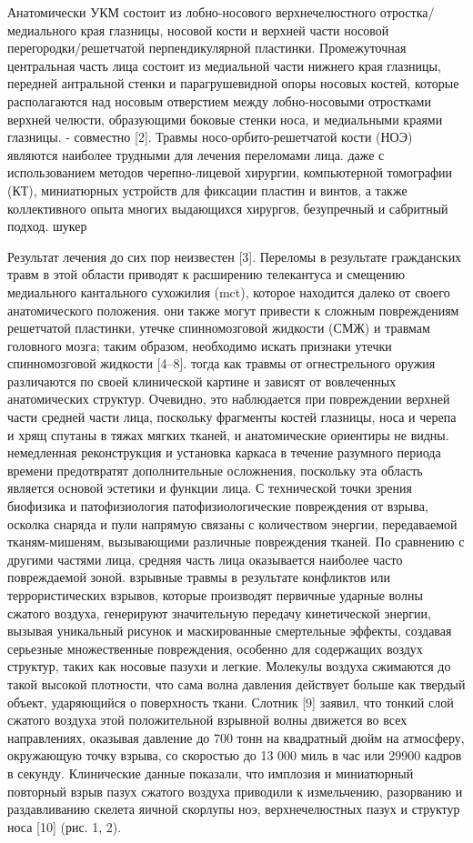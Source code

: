 Анатомически УКМ состоит из лобно-носового верхнечелюстного отростка/медиального
края глазницы, носовой кости и верхней части носовой перегородки/решетчатой
перпендикулярной пластинки. Промежуточная центральная часть лица
состоит из медиальной части нижнего края глазницы, передней антральной стенки и
парагрушевидной опоры носовых костей, которые располагаются над носовым
отверстием между лобно-носовыми отростками верхней челюсти, образующими боковые
стенки носа, и медиальными краями глазницы. - совместно [2]. Травмы
носо-орбито-решетчатой кости (НОЭ) являются наиболее трудными для
лечения переломами лица. даже с использованием методов черепно-лицевой хирургии,
компьютерной томографии (КТ), миниатюрных устройств для фиксации пластин и
винтов, а также коллективного опыта многих выдающихся хирургов, безупречный и
сабритный подход. шукер

Результат лечения до сих пор неизвестен [3]. Переломы в результате гражданских
травм в этой области приводят к расширению телекантуса и смещению медиального
кантального сухожилия (mct), которое находится далеко от своего анатомического
положения. они также могут привести к сложным повреждениям решетчатой
пластинки, утечке спинномозговой жидкости (СМЖ) и травмам головного
мозга; таким образом, необходимо искать признаки утечки спинномозговой жидкости
[4–8]. тогда как травмы от огнестрельного оружия различаются по своей
клинической картине и зависят от вовлеченных анатомических структур. Очевидно,
это наблюдается при повреждении верхней части средней части лица, поскольку
фрагменты костей глазницы, носа и черепа и хрящ спутаны в тяжах мягких тканей, и
анатомические ориентиры не видны. немедленная реконструкция и установка каркаса
в течение разумного периода времени предотвратят дополнительные осложнения,
поскольку эта область является основой эстетики и функции лица. С технической
точки зрения биофизика и патофизиология патофизиологические повреждения от
взрыва, осколка снаряда и пули напрямую связаны с количеством энергии,
передаваемой тканям-мишеням, вызывающими различные повреждения тканей. По
сравнению с другими частями лица, средняя часть лица оказывается наиболее часто
повреждаемой зоной. взрывные травмы в результате конфликтов или террористических
взрывов, которые производят первичные ударные волны сжатого воздуха, генерируют
значительную передачу кинетической энергии, вызывая уникальный рисунок и
маскированные смертельные эффекты, создавая серьезные множественные повреждения,
особенно для содержащих воздух структур, таких как носовые пазухи и легкие.
Молекулы воздуха сжимаются до такой высокой плотности, что сама волна давления
действует больше как твердый объект, ударяющийся о поверхность ткани. Слотник
[9] заявил, что тонкий слой сжатого воздуха этой положительной взрывной волны
движется во всех направлениях, оказывая давление до 700 тонн на квадратный дюйм
на атмосферу, окружающую точку взрыва, со скоростью до 13 000 миль в час или
29900 кадров в секунду. Клинические данные показали, что имплозия и миниатюрный
повторный взрыв пазух сжатого воздуха приводили к измельчению, разорванию и
раздавливанию скелета яичной скорлупы ноэ, верхнечелюстных пазух и структур носа
[10] (рис. 1, 2).

